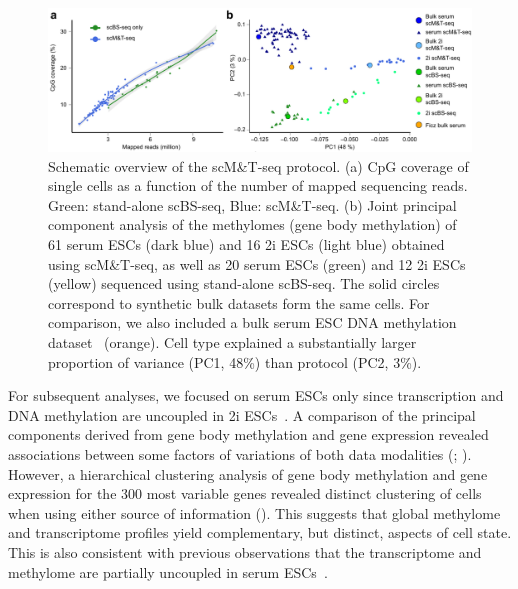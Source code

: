 \begin{figure}[htbp!]
\centering
\includegraphics[width=1.0\textwidth]{qc}
\caption[Quality controls of scM\&T-seq protocol.]{Schematic overview of the scM\&T-seq protocol. (a) CpG coverage of single cells as a function of the number of mapped sequencing reads. Green: stand-alone scBS-seq, Blue: scM\&T-seq. (b) Joint principal component analysis of the methylomes (gene body methylation) of 61 serum ESCs (dark blue) and 16 2i ESCs (light blue) obtained using scM\&T-seq, as well as 20 serum ESCs (green) and 12 2i ESCs (yellow) sequenced using stand-alone scBS-seq. The solid circles correspond to synthetic bulk datasets form the same cells. For comparison, we also included a bulk serum ESC DNA methylation dataset~\citep{ficz_fgf_2013} (orange). Cell type explained a substantially larger proportion of variance (PC1, 48\%) than protocol (PC2, 3\%).}
\label{fig:mt_qc}
\end{figure}

For subsequent analyses, we focused on serum ESCs only since transcription and DNA methylation are uncoupled in 2i ESCs~\citep{ficz_fgf_2013,habibi_whole-genome_2013}. A comparison of the principal components derived from gene body methylation and gene expression revealed associations between some factors of variations of both data modalities (; ). However, a hierarchical clustering analysis of gene body methylation and gene expression for the 300 most variable genes revealed distinct clustering of cells when using either source of information (). This suggests that global methylome and transcriptome profiles yield complementary, but distinct, aspects of cell state. This is also consistent with previous observations that the transcriptome and methylome are partially uncoupled in serum ESCs~\citep{ficz_fgf_2013}.

